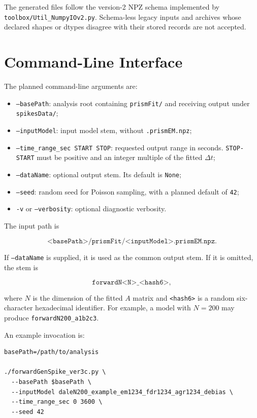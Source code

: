 \documentclass[11pt]{article}
\begin{document}
The generated files follow the version-2 NPZ schema implemented by
\texttt{toolbox/Util\_NumpyIOv2.py}. Schema-less legacy inputs and archives
whose declared shapes or dtypes disagree with their stored records are not
accepted.

\section{Command-Line Interface}
\label{sec:cli}

The planned command-line arguments are:
\begin{itemize}
  \item \texttt{--basePath}: analysis root containing
        \texttt{prismFit/} and receiving output under
        \texttt{spikesData/};
  \item \texttt{--inputModel}: input model stem, without
        \texttt{.prismEM.npz};
  \item \texttt{--time\_range\_sec START STOP}: requested output range in
        seconds. \texttt{STOP-START} must be positive and an integer
        multiple of the fitted \(\Delta t\);
  \item \texttt{--dataName}: optional output stem. Its default is
        \texttt{None};
  \item \texttt{--seed}: random seed for Poisson sampling, with a planned
        default of \texttt{42};
  \item \texttt{-v} or \texttt{--verbosity}: optional diagnostic
        verbosity.
\end{itemize}

The input path is

\[
\texttt{<basePath>/prismFit/<inputModel>.prismEM.npz}.
\]

If \texttt{--dataName} is supplied, it is used as the common output stem.
If it is omitted, the stem is

\[
\texttt{forwardN<N>\_<hash6>},
\]

where \(N\) is the dimension of the fitted \(A\) matrix and
\texttt{<hash6>} is a random six-character hexadecimal identifier. For
example, a model with \(N=200\) may produce
\texttt{forwardN200\_a1b2c3}.

An example invocation is:
\begin{verbatim}
basePath=/path/to/analysis

./forwardGenSpike_ver3c.py \
  --basePath $basePath \
  --inputModel daleN200_example_em1234_fdr1234_agr1234_debias \
  --time_range_sec 0 3600 \
  --seed 42
\end{verbatim}
\end{document}
